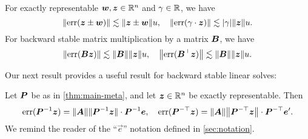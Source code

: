 \documentclass[onefignum,onetabnum,pagebackref,dvipsnames]{siamart220329}
\begin{document}
\begin{fact} \label{fact:basic-stability}
    For exactly representable $\boldsymbol{w},\boldsymbol{z}\in\mathbb{R}^n$ and $\gamma \in \mathbb{R}$, we have
    \begin{equation*}
        \norm{\err(\vec{z} \pm \vec{w})}\lesssim \norm{\vec{z} \pm \vec{w}}u, \quad \norm{\err(\gamma\cdot \vec{z})} \lesssim |\gamma| \norm{\vec{z}} u.
    \end{equation*}
    For backward stable matrix multiplication by a matrix $\boldsymbol{B}$, we have
    \begin{equation*}
        \norm{\err(\mat{B}\vec{z})} \lesssim \norm{\mat{B}} \norm{\vec{z}} u, \quad \big\|\smash{\err(\mat{B}^\top\vec{z})}\big\| \lesssim \norm{\mat{B}} \norm{\vec{z}} u.
    \end{equation*}
\end{fact}

Our next result provides a useful result for backward stable linear solves:

\begin{proposition} \label{prop:backward}
    Let $\boldsymbol{P}$ be as in \cref{thm:main-meta}, and let $\boldsymbol{z} \in \mathbb{R}^n$ be exactly representable.
    Then
    \begin{equation*}
        \err(\mat{P}^{-1}\vec{z}) = \norm{\mat{A}}\norm{\smash{\mat{P}^{-1}\vec{z}}} \cdot \mat{P}^{-1}\vec{e}, \quad \err(\mat{P}^{-\top}\vec{z}) = \norm{\mat{A}}\big\|\mat{P}^{-\top}\vec{z}\big\| \cdot \mat{P}^{-\top}\vec{e}'.
    \end{equation*}
    We remind the reader of the ``$\vec{e}$'' notation defined in \cref{sec:notation}.
\end{proposition}
\end{document}
